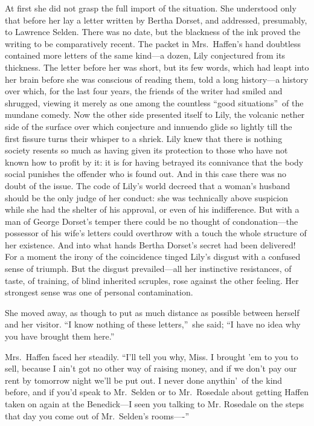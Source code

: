 \documentclass[12pt,a4paper]{book}
\begin{document}
At first she did not grasp the full import of the situation. She
understood only that before her lay a letter written by Bertha
Dorset, and addressed, presumably, to Lawrence Selden. There was
no date, but the blackness of the ink proved the writing to be
comparatively recent. The packet in Mrs.\ Haffen's hand doubtless
contained more letters of the same kind---a dozen, Lily
conjectured from its thickness. The letter before her was short,
but its few words, which had leapt into her brain before she was
conscious of reading them, told a long history---a history over
which, for the last four years, the friends of the writer had
smiled and shrugged, viewing it merely as one among the countless
``good situations''\ of the mundane comedy. Now the other side
presented itself to Lily, the volcanic nether side of the surface
over which conjecture and innuendo glide so lightly till the
first fissure turns their whisper to a shriek. Lily knew that
there is nothing society resents so much as having given its
protection to those who have not known how to profit by it: it is
for having betrayed its connivance that the body social punishes
the offender who is found out. And in this case there was no
doubt of the issue. The code of Lily's world decreed that a
woman's husband should be the only judge of her conduct: she was
technically above suspicion while she had the shelter of his
approval, or even of his indifference. But with a man of George
Dorset's temper there could be no thought of condonation---the
possessor of his wife's letters could overthrow with a touch the
whole structure of her existence. And into what hands Bertha
Dorset's secret had been delivered! For a moment the irony of the
coincidence tinged Lily's disgust with a confused sense of
triumph. But the disgust prevailed---all her instinctive
resistances, of taste, of training, of blind inherited scruples,
rose against the other feeling. Her strongest sense was one of
personal contamination.





She moved away, as though to put as much distance as possible
between herself and her visitor. ``I know nothing of these
letters,''\ she said; ``I have no idea why you have brought them
here.''





Mrs.\ Haffen faced her steadily. ``I'll tell you why, Miss. 
I brought 'em to you to sell, because I ain't got no other way
of raising money, and if we don't pay our rent by tomorrow night
we'll be put out. I never done anythin'\ of the kind before, and
if you'd speak to Mr.\ Selden or to Mr.\ Rosedale about getting
Haffen taken on again at the Benedick---I seen you talking to Mr.
Rosedale on the steps that day you come out of Mr.\ Selden's
rooms----''
\end{document}
